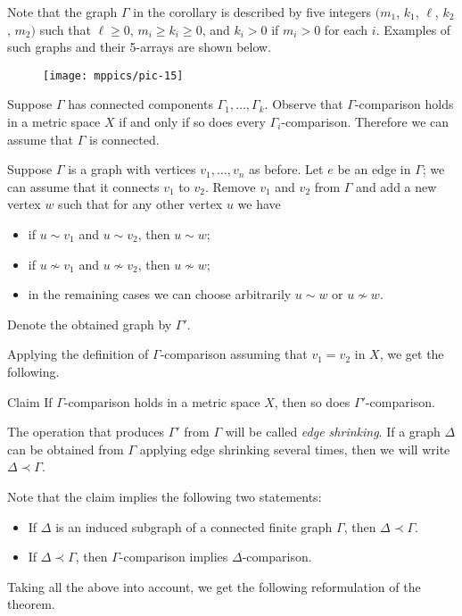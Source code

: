 \documentclass{article}
\begin{document}
Note that the graph $\Gamma$ in the corollary is described by five integers $(m_1$, $k_1$, $\ell$, $k_2$, $m_2)$ such that $\ell \geqslant 0$, $m_i\geqslant k_i\ge 0$, and $k_i>0$ if $m_i>0$ for each $i$.
Examples of such graphs and their 5-arrays are shown below.
\begin{figure}[ht!]
\centering
\texttt{[image: mppics/pic-15]}
\end{figure}

\bigskip

Suppose $\Gamma$ has connected components $\Gamma_1,\dots,\Gamma_k$.
Observe that $\Gamma$-comparison holds in a metric space $X$ if and only if so does every $\Gamma_i$-comparison.
Therefore we can assume that $\Gamma$ is connected.

Suppose $\Gamma$ is a graph with vertices $v_1,\dots,v_n$ as before.
Let $e$ be an edge in $\Gamma$; we can assume that it connects $v_1$ to $v_2$.
Remove $v_1$ and $v_2$ from $\Gamma$ and add a new vertex $w$ such that for any other vertex $u$ we have
\begin{itemize}
 \item if $u\sim v_1$ and $u\sim v_2$, then $u\sim w$;
 \item if $u\nsim v_1$ and $u\nsim v_2$, then $u\nsim w$;
 \item in the remaining cases we can choose arbitrarily $u\sim w$ or $u\nsim w$.
\end{itemize}
Denote the obtained graph by $\Gamma'$.

Applying the definition of $\Gamma$-comparison assuming that $v_1=v_2$ in $X$, we get the following.

\begin{thm}{Claim}
If $\Gamma$-comparison holds in a metric space $X$, then so does $\Gamma'$-comparison.

\end{thm}

The operation that produces $\Gamma'$ from $\Gamma$ will be called \emph{edge shrinking}.
If a graph $\Delta$ can be obtained from $\Gamma$ applying edge shrinking several times, then we will write $\Delta\prec \Gamma$.

Note that the claim implies the following two statements:
\begin{itemize}
 \item If $\Delta$ is an induced subgraph of a connected finite graph $\Gamma$, then $\Delta\prec \Gamma$.
 \item If $\Delta\prec \Gamma$, then $\Gamma$-comparison implies $\Delta$-comparison.
\end{itemize}
Taking all the above into account, we get the following reformulation of the theorem.
\end{document}
